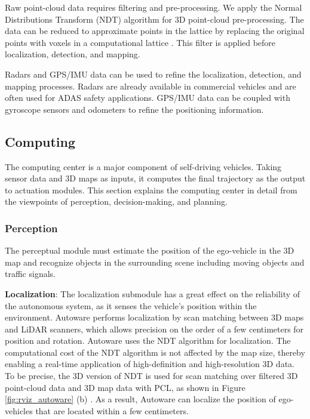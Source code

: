 Raw point-cloud data requires filtering and pre-processing.
We apply the Normal Distributions Transform (NDT)
algorithm \cite{biber2003normal} for 3D point-cloud pre-processing. 
The data can be reduced to approximate
points in the lattice by replacing the original points with voxels in a computational lattice \cite{magnusson2009three}.
This filter is applied before localization, detection, and
mapping.

Radars and GPS/IMU data can be used to refine the
localization, detection, and mapping processes.
Radars are already available in commercial vehicles and are often used
for ADAS safety applications.
GPS/IMU data can be coupled with gyroscope sensors and odometers to refine the
positioning information.

\subsection{Computing}
\label{sec:computing}

The computing center is a major component of self-driving
vehicles.
Taking sensor data and 3D maps as inputs, it computes the final
trajectory as the output to actuation modules.
This section explains the computing center in detail from the viewpoints of perception,
decision-making, and planning.

\subsubsection{Perception}
\label{sec:perception}
The perceptual module must estimate the position of the
ego-vehicle in the 3D map and recognize objects in the surrounding scene
including moving objects and traffic signals.

\textbf{Localization}:
The localization submodule has a great effect on the
reliability of the autonomous system, as it senses the vehicle's position within the environment.
Autoware performs localization by scan matching between 3D maps and
LiDAR scanners, which allows precision on the order of a few centimeters for
position and rotation.
Autoware uses the NDT \cite{biber2003normal} algorithm for
localization.
The computational cost of the NDT algorithm is not affected by the map
size, thereby enabling a real-time application of high-definition and high-resolution 3D data.
To be precise, the 3D version of NDT is used for scan matching
over filtered 3D point-cloud data and 3D map data with PCL, as shown
in Figure \ref{fig:rviz_autoware} (b) \cite{magnusson2009three}.
As a result, Autoware can localize the position of ego-vehicles that are located within a few centimeters.

